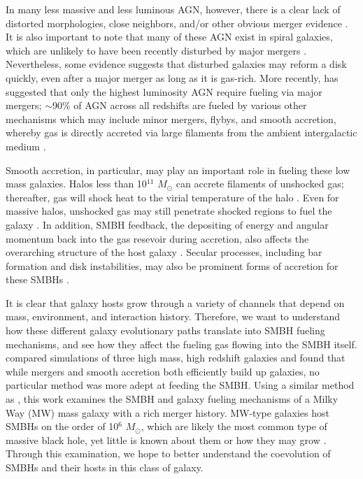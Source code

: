 \documentclass[manuscript]{aastex}
\begin{document}
In many less massive and less luminous AGN, however, there is a clear lack of distorted morphologies, close neighbors, and/or other obvious merger evidence \citep{Ryan2007,Schawinski2011,Ellison2013,Hicks2013}. It is also important to note that many of these AGN exist in spiral galaxies, which are unlikely to have been recently disturbed by major mergers \citep{Springel2005,Kocevski2011}. Nevertheless, some evidence suggests \citep{vanGorkom1997,Governato2009} that disturbed galaxies may reform a disk quickly, even after a major merger as long as it is gas-rich. More recently, \cite{Treister2012} has suggested that only the highest luminosity AGN require fueling via major mergers; $\sim$90\% of AGN across all redshifts are fueled by various other mechanisms which may include minor mergers, flybys, and smooth accretion, whereby gas is directly accreted via large filaments from the ambient intergalactic medium \citep{Cox2006,Bellovary2013,Sinha2012}. 

Smooth accretion, in particular, may play an important role in fueling these low mass galaxies. Halos less than 10$^{11}$ $M_{\odot}$ can accrete filaments of unshocked gas; thereafter, gas will shock heat to the virial temperature of the halo \citep{Keres2005}. Even for massive halos, unshocked gas may still penetrate shocked regions to fuel the galaxy \citep{Brooks2007,Dekel2009,Nelson2013}. In addition, SMBH feedback, the depositing of energy and angular momentum back into the gas resevoir during accretion, also affects the overarching structure of the host galaxy \citep{Governato2009a}. Secular processes, including bar formation and disk instabilities, may also be prominent forms of accretion for these SMBHs \citep{Kormendy2013}. 
	
It is clear that galaxy hosts grow through a variety of channels that depend on mass, environment, and interaction history. Therefore, we want to understand how these different galaxy evolutionary paths translate into SMBH fueling mechanisms, and see how they affect the fueling gas flowing into the SMBH itself. \cite{Bellovary2013} compared simulations of three high mass, high redshift galaxies and found that while mergers and smooth accretion both efficiently build up galaxies, no particular method was more adept at feeding the SMBH. Using a similar method as \cite{Bellovary2013}, this work examines the SMBH and galaxy fueling mechanisms of a Milky Way (MW) mass galaxy with a rich merger history. MW-type galaxies host SMBHs on the order of 10$^6$ $M_{\odot}$, which are likely the most common type of massive black hole, yet little is known about them or how they may grow \citep{Kormendy2013}. Through this examination, we hope to better understand the coevolution of SMBHs and their hosts in this class of galaxy. 
\end{document}
